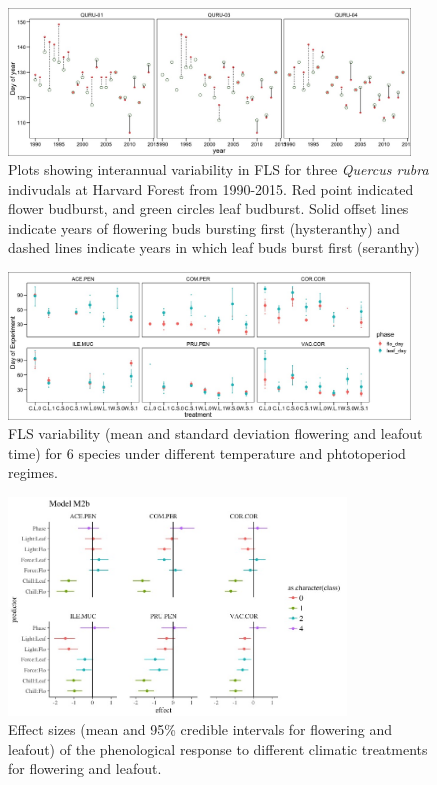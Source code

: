 \documentclass{article}\usepackage[]{graphicx}\usepackage[]{color}
\begin{document}
\begin{figure}[here]
\includegraphics[width=0.95\textwidth]{..//figures/QURU_HF_intervar.jpeg} %
\caption{Plots showing interannual variability in FLS for three \textit{Quercus rubra} indivudals at Harvard Forest from 1990-2015. Red point indicated flower budburst, and green circles leaf budburst. Solid offset lines indicate years of flowering buds bursting first (hysteranthy) and dashed lines indicate years in which leaf buds burst first (seranthy)}
\label{fig:Figure 3}
\end{figure}

\begin{figure}[here]
\includegraphics[width=0.95\textwidth]{..//figures/raw_flobuds.jpeg}
\caption{FLS variability (mean and standard deviation flowering and leafout time) for 6 species under different temperature and phtotoperiod regimes.}
\label{fig:Figure 4}
\end{figure}

\begin{figure}[here]
\includegraphics[width=0.8\textwidth]{..//figures/Goods_mod2b.jpeg}
\caption{Effect sizes (mean and 95\% credible intervals for flowering and leafout) of the phenological response to different climatic treatments for flowering and leafout.}
\label{fig:Figure 5}
\end{figure}
\end{document}
